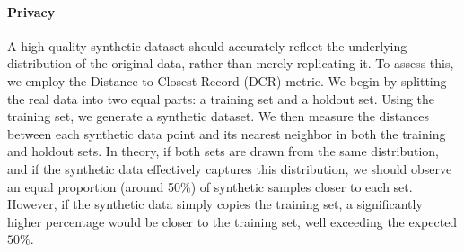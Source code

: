 \paragraph{Privacy}
A high-quality synthetic dataset should accurately reflect the underlying distribution of the original data, rather than merely replicating it. To assess this, we employ the Distance to Closest Record (DCR) metric. We begin by splitting the real data into two equal parts: a training set and a holdout set. Using the training set, we generate a synthetic dataset. We then measure the distances between each synthetic data point and its nearest neighbor in both the training and holdout sets. In theory, if both sets are drawn from the same distribution, and if the synthetic data effectively captures this distribution, we should observe an equal proportion (around 50$\%$) of synthetic samples closer to each set. However, if the synthetic data simply copies the training set, a significantly higher percentage would be closer to the training set, well exceeding the expected $50\%$.



